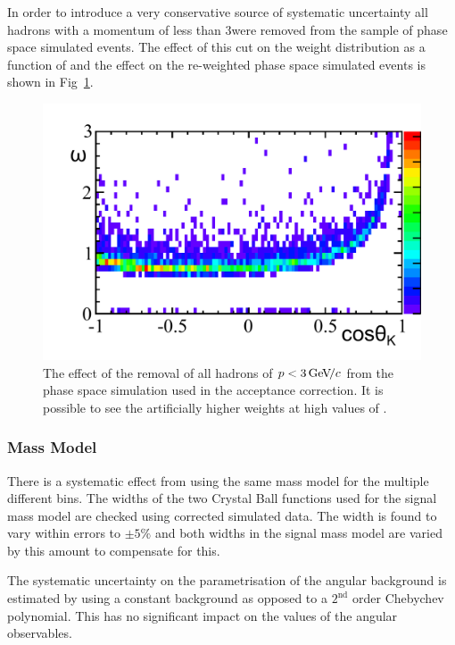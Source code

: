 In order to introduce a very conservative source of systematic uncertainty all hadrons with a momentum of less than
 3\gevc were removed from the sample of phase space simulated events.
The effect of this cut on the weight distribution as a function of \ctk and the effect on the re-weighted phase 
space simulated events is shown in Fig~\ref{fig:kstmm:sys:hadronp}.
\begin{figure}[tbp]
\centering
\includegraphics[width=0.48\columnwidth]{chapter5/figs/sys/validation_weight_ctk_hadronpcut_new.pdf}
\caption[  The effect of the removal of all hadrons of $p<3\gevc$ from the phase space simulation used in the acceptance correction.  ]
{ The effect of the removal of all hadrons of $p<3\gevc$ from the phase space simulation used in the acceptance correction. 
It is possible to see the artificially higher weights at high values of \ctk. 
~\label{fig:kstmm:sys:hadronp} }
\end{figure}

\subsubsection{Mass Model}

There is a systematic effect from using the same mass model for the multiple different \qsq bins.
The widths of the two Crystal Ball functions used for the signal mass model are checked using 
corrected simulated \BdToKstmm data. The width is found to vary within errors to $\pm5\%$ and
both widths in the signal mass model are varied by this amount to compensate for this.

The systematic uncertainty on the parametrisation of the angular background is estimated by using a 
constant background as opposed to a $2^{\text{nd}}$ order Chebychev polynomial.
This has no significant impact on the values of the angular observables.

